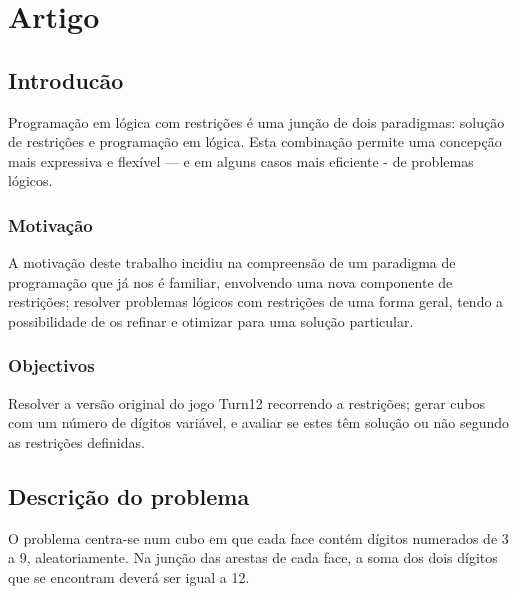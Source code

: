 %
%

\chapter{Artigo}
\label{art}

\section{Introducão}
\label{introduction} %

Programação em lógica com restrições é uma junção de dois paradigmas: solução de restrições e programação em lógica. Esta combinação permite uma concepção mais expressiva e flexível — e em alguns casos mais eficiente - de problemas lógicos.

\subsection{Motivação}
\label{sec:1}
A motivação deste trabalho incidiu na compreensão de um paradigma de programação que já nos é familiar, envolvendo uma nova componente de restrições; resolver problemas lógicos com restrições de uma forma geral, tendo a possibilidade de os refinar e otimizar para uma solução particular.

\subsection{Objectivos}
\label{sec:2}
Resolver a versão original do jogo Turn12 recorrendo a restrições; gerar cubos com um número de dígitos variável, e avaliar se estes têm solução ou não segundo as restrições definidas.


\section{Descrição do problema}
\label{sec:3}
O problema centra-se num cubo em que cada face contém dígitos numerados de 3 a 9, aleatoriamente. Na junção das arestas de cada face, a soma dos dois dígitos que se encontram deverá ser igual a 12.

